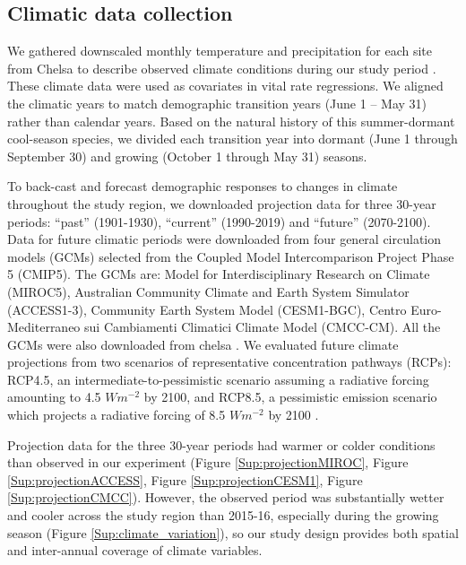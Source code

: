 \documentclass[12pt]{article}
\begin{document}
\subsection*{Climatic data collection}
We gathered downscaled monthly temperature and precipitation for each site from Chelsa to describe observed climate conditions during our study period \citep{karger2017climatologies}.
These climate data were used as covariates in vital rate regressions. 
We aligned the climatic years to match demographic transition years (June 1 -- May 31) rather than calendar years.
Based on the natural history of this summer-dormant cool-season species, we divided each transition year into dormant (June 1 through September 30) and growing (October 1 through May 31) seasons. 

To back-cast and forecast demographic responses to changes in climate throughout the study region, we downloaded projection data for three 30-year periods: ``past'' (1901-1930), ``current'' (1990-2019) and ``future'' (2070-2100).
Data for future climatic periods were downloaded from four general circulation models (GCMs) selected from the Coupled Model Intercomparison Project Phase 5 (CMIP5). 
The GCMs are: Model for Interdisciplinary Research on Climate (MIROC5), Australian Community Climate and Earth System Simulator (ACCESS1-3), Community Earth System Model (CESM1-BGC), Centro Euro-Mediterraneo sui Cambiamenti Climatici Climate Model (CMCC-CM).
All the GCMs were also downloaded from chelsa \citep{sanderson2015representative}.
We evaluated future climate projections from two scenarios of representative concentration pathways (RCPs): RCP4.5, an intermediate-to-pessimistic scenario assuming a radiative forcing amounting to 4.5 $W m^{-2}$ by 2100, and RCP8.5, a pessimistic emission scenario which projects a radiative forcing of 8.5 $W m^{-2}$ by 2100 \citep{thomson2011rcp4, schwalm2020rcp8}. 

Projection data for the three 30-year periods had warmer or colder conditions than observed in our experiment (Figure \ref{Sup:projectionMIROC}, Figure \ref{Sup:projectionACCESS}, Figure \ref{Sup:projectionCESM1}, Figure \ref{Sup:projectionCMCC}). 
However, the observed period was substantially wetter and cooler across the study region than 2015-16, especially during the growing season (Figure \ref{Sup:climate_variation}), so our study design provides both spatial and inter-annual coverage of climate variables. 
\end{document}
